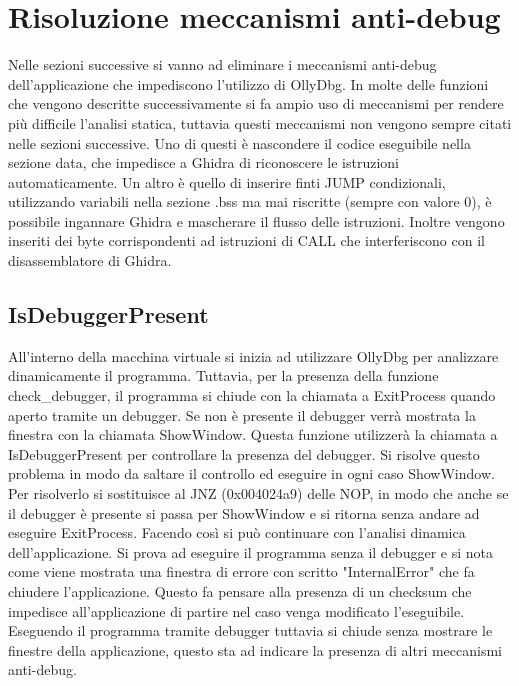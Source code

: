 \documentclass[a4paper,12pt]{article}
\begin{document}
\section{Risoluzione meccanismi anti-debug}
Nelle sezioni successive si vanno ad eliminare i meccanismi anti-debug dell'applicazione che impediscono l'utilizzo di OllyDbg. In molte delle funzioni che vengono descritte successivamente si fa ampio uso di meccanismi per rendere più difficile l'analisi statica, tuttavia questi meccanismi non vengono sempre citati nelle sezioni successive. Uno di questi è nascondere il codice eseguibile nella sezione data, che impedisce a Ghidra di riconoscere le istruzioni automaticamente. 
Un altro è quello di inserire finti JUMP condizionali, utilizzando variabili nella sezione .bss ma mai riscritte (sempre con valore 0), è possibile ingannare Ghidra e mascherare il flusso delle istruzioni. Inoltre vengono inseriti dei byte corrispondenti ad istruzioni di CALL che interferiscono con il disassemblatore di Ghidra.

\subsection{IsDebuggerPresent}
All'interno della macchina virtuale si inizia ad utilizzare OllyDbg per analizzare dinamicamente il programma. Tuttavia, per la presenza della funzione check\_debugger, il programma si chiude con la chiamata a ExitProcess quando aperto tramite un debugger. Se non è presente il debugger verrà mostrata la finestra con la chiamata ShowWindow.  Questa funzione utilizzerà la chiamata a IsDebuggerPresent per controllare la presenza del debugger.
Si risolve questo problema in modo da saltare il controllo ed eseguire in ogni caso ShowWindow. Per risolverlo si sostituisce al JNZ (0x004024a9) delle NOP, in modo che anche se il debugger è presente si passa per ShowWindow e si ritorna senza andare ad eseguire ExitProcess.
 Facendo così si può continuare con l'analisi dinamica dell'applicazione. Si prova ad eseguire il programma senza il debugger e si nota come viene mostrata una finestra di errore con scritto "InternalError" che fa chiudere l'applicazione. Questo fa pensare alla presenza di un checksum che impedisce all'applicazione di partire nel caso venga modificato l'eseguibile.  Eseguendo il programma tramite debugger tuttavia si chiude senza mostrare le finestre della applicazione, questo sta ad indicare la presenza di altri meccanismi anti-debug. 
\end{document}
